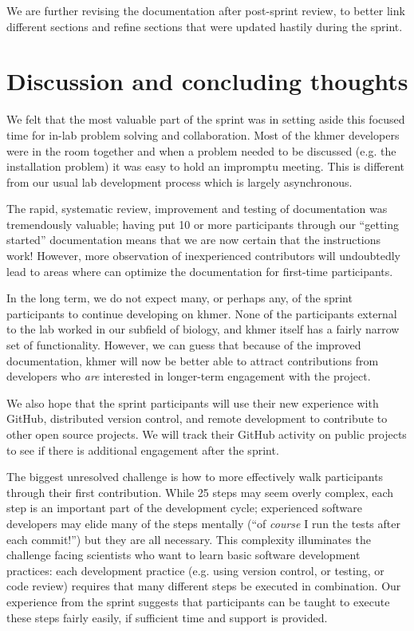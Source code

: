 \documentclass[12pt]{article}
\begin{document}
We are further revising the documentation after post-sprint review, to
better link different sections and refine sections that were updated
hastily during the sprint.

\section{Discussion and concluding thoughts}

We felt that the most valuable part of the sprint was in setting aside
this focused time for in-lab problem solving and collaboration.  Most of
the khmer developers were in the room together and when a problem
needed to be discussed (e.g. the installation problem) it was easy to
hold an impromptu meeting.  This is different from our usual lab
development process which is largely asynchronous.

The rapid, systematic review, improvement and testing of documentation
was tremendously valuable; having put 10 or more participants through
our ``getting started'' documentation means that we are now certain
that the instructions work!  However, more observation of
inexperienced contributors will undoubtedly lead to areas where can
optimize the documentation for first-time participants.

In the long term, we do not expect many, or perhaps any, of the sprint
participants to continue developing on khmer.  None of the
participants external to the lab worked in our subfield of biology,
and khmer itself has a fairly narrow set of functionality.  However,
we can guess that because of the improved documentation, khmer will
now be better able to attract contributions from developers who {\em
  are} interested in longer-term engagement with the project.

We also hope that the sprint participants will use their new experience
with GitHub, distributed version control, and remote development to
contribute to other open source projects.  We will track their
GitHub activity on public projects to see if there is additional
engagement after the sprint.

The biggest unresolved challenge is how to more effectively walk
participants through their first contribution.  While 25 steps may
seem overly complex, each step is an important part of the development
cycle; experienced software developers may elide many of the steps
mentally (``of {\em course} I run the tests after each commit!'') but
they are all necessary.  This complexity illuminates the challenge
facing scientists who want to learn basic software development
practices: each development practice (e.g. using version control, or
testing, or code review) requires that many different steps be
executed in combination.  Our experience from the sprint suggests
that participants can be taught to execute these steps fairly easily,
if sufficient time and support is provided.
\end{document}
